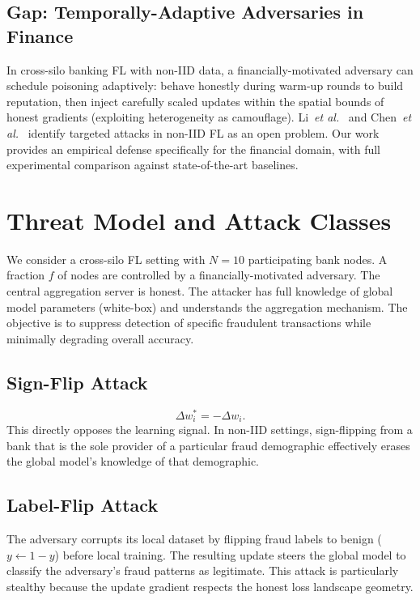 \documentclass[journal]{IEEEtran}
\newcommand{\etal}{\textit{et al.}}
\begin{document}
\subsection{Gap: Temporally-Adaptive Adversaries in Finance}
In cross-silo banking FL with non-IID data, a financially-motivated adversary
can schedule poisoning adaptively: behave honestly during warm-up rounds to
build reputation, then inject carefully scaled updates within the spatial
bounds of honest gradients (exploiting heterogeneity as camouflage).
Li~\etal~\cite{li2023multitentacle} and Chen~\etal~\cite{chen2021rffl}
identify targeted attacks in non-IID FL as an open problem. Our work
provides an empirical defense specifically for the financial domain, with
full experimental comparison against state-of-the-art baselines.

\section{Threat Model and Attack Classes}

We consider a cross-silo FL setting with $N = 10$ participating bank nodes.
A fraction $f$ of nodes are controlled by a financially-motivated adversary.
The central aggregation server is honest. The attacker has full knowledge
of global model parameters (white-box) and understands the aggregation
mechanism. The objective is to suppress detection of specific fraudulent
transactions while minimally degrading overall accuracy.

\subsection{Sign-Flip Attack}
\begin{equation}
  \Delta w_i^* = -\Delta w_i.
\end{equation}
This directly opposes the learning signal. In non-IID settings, sign-flipping
from a bank that is the sole provider of a particular fraud demographic
effectively erases the global model's knowledge of that demographic.

\subsection{Label-Flip Attack}
The adversary corrupts its local dataset by flipping fraud labels to benign
($y \leftarrow 1 - y$) before local training. The resulting update steers the
global model to classify the adversary's fraud patterns as legitimate. This
attack is particularly stealthy because the update gradient respects the
honest loss landscape geometry.
\end{document}
